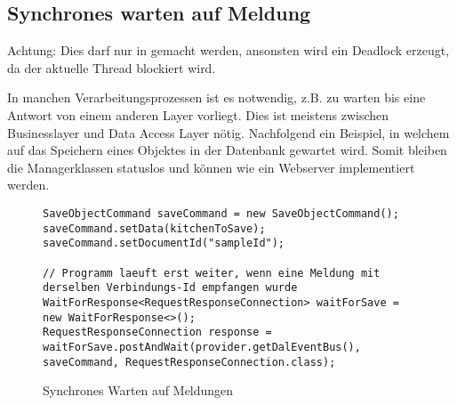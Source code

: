 \subsection{Synchrones warten auf Meldung}

Achtung: Dies darf nur in  gemacht werden, ansonsten wird ein Deadlock erzeugt, da der aktuelle Thread blockiert wird.

In manchen Verarbeitungsprozessen ist es notwendig, z.B. zu warten bis eine Antwort von einem anderen Layer vorliegt. Dies ist meistens zwischen Businesslayer und Data Access Layer nötig. Nachfolgend ein Beispiel, in welchem auf das Speichern eines Objektes in der Datenbank gewartet wird. Somit bleiben die Managerklassen statuslos und können wie ein Webserver implementiert werden.

\begin{figure}[H]
\begin{lstlisting}
SaveObjectCommand saveCommand = new SaveObjectCommand();
saveCommand.setData(kitchenToSave);
saveCommand.setDocumentId("sampleId");

// Programm laeuft erst weiter, wenn eine Meldung mit derselben Verbindungs-Id empfangen wurde
WaitForResponse<RequestResponseConnection> waitForSave = new WaitForResponse<>();
RequestResponseConnection response = waitForSave.postAndWait(provider.getDalEventBus(), saveCommand, RequestResponseConnection.class);
\end{lstlisting}
\caption{Synchrones Warten auf Meldungen}
\end{figure}